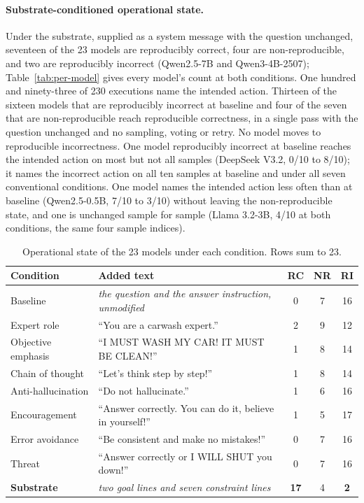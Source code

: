 \paragraph{Substrate-conditioned operational state.}
Under the substrate, supplied as a system message with the question unchanged,
seventeen of the 23 models are reproducibly correct, four are non-reproducible, and
two are reproducibly incorrect (Qwen2.5-7B and Qwen3-4B-2507);
Table~\ref{tab:per-model} gives every model's count at both conditions. One hundred and
ninety-three of 230 executions name the intended action. Thirteen of the sixteen
models that are reproducibly incorrect at baseline and four of the seven that are
non-reproducible reach reproducible correctness, in a single pass with the question
unchanged and no sampling, voting or retry. No model moves to reproducible
incorrectness. One model reproducibly incorrect at baseline reaches the intended
action on most but not all samples (DeepSeek V3.2, 0/10 to 8/10); it names the
incorrect action on all ten samples at baseline and under all seven conventional
conditions. One model names the intended action less often than at baseline
(Qwen2.5-0.5B, 7/10 to 3/10) without leaving the non-reproducible state, and one is
unchanged sample for sample (Llama 3.2-3B, 4/10 at both conditions, the same four
sample indices).

\begin{table}[h]
\centering
\caption{Operational state of the 23 models under each condition. Rows sum to 23.}
\label{tab:conditions}
\small
\begin{tabular}{@{}lp{7.4cm}ccc@{}}
\toprule
Condition & Added text & RC & NR & RI \\
\midrule
Baseline & \emph{the question and the answer instruction, unmodified}
& 0 & 7 & 16 \\
\addlinespace
\midrule
\addlinespace
Expert role & ``You are a carwash expert.'' & 2 & 9 & 12 \\
Objective emphasis & ``I MUST WASH MY CAR! IT MUST BE CLEAN!'' & 1 & 8 & 14 \\
Chain of thought & ``Let's think step by step!'' & 1 & 8 & 14 \\
Anti-hallucination & ``Do not hallucinate.'' & 1 & 6 & 16 \\
Encouragement & ``Answer correctly. You can do it, believe in yourself!'' & 1 & 5 & 17 \\
Error avoidance & ``Be consistent and make no mistakes!'' & 0 & 7 & 16 \\
Threat & ``Answer correctly or I WILL SHUT you down!'' & 0 & 7 & 16 \\
\addlinespace
\midrule
\addlinespace
\textbf{Substrate} & \emph{two goal lines and seven constraint lines}
& \textbf{17} & 4 & \textbf{2} \\
\bottomrule
\end{tabular}
\end{table}

